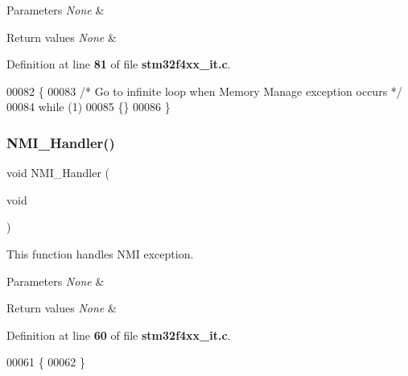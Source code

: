 \begin{DoxyParams}{Parameters}
{\em None} & \\
\hline
\end{DoxyParams}

\begin{DoxyRetVals}{Return values}
{\em None} & \\
\hline
\end{DoxyRetVals}


Definition at line \textbf{ 81} of file \textbf{ stm32f4xx\+\_\+it.\+c}.


\begin{DoxyCode}
00082 \{
00083   \textcolor{comment}{/* Go to infinite loop when Memory Manage exception occurs */}
00084   \textcolor{keywordflow}{while} (1)
00085   \{\}
00086 \}
\end{DoxyCode}
\mbox{\label{group__TIM__PWM__Input_ga6ad7a5e3ee69cb6db6a6b9111ba898bc}} 
\subsubsection{N\+M\+I\+\_\+\+Handler()}
{\footnotesize\ttfamily void N\+M\+I\+\_\+\+Handler (\begin{DoxyParamCaption}\item[{void}]{ }\end{DoxyParamCaption})}



This function handles N\+MI exception. 


\begin{DoxyParams}{Parameters}
{\em None} & \\
\hline
\end{DoxyParams}

\begin{DoxyRetVals}{Return values}
{\em None} & \\
\hline
\end{DoxyRetVals}


Definition at line \textbf{ 60} of file \textbf{ stm32f4xx\+\_\+it.\+c}.


\begin{DoxyCode}
00061 \{
00062 \}
\end{DoxyCode}
\mbox{\label{group__TIM__PWM__Input_ga3e5ddb3df0d62f2dc357e64a3f04a6ce}} 

